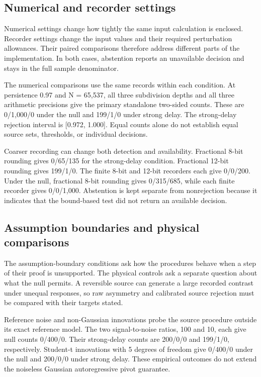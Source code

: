 \subsection{Numerical and recorder settings}

Numerical settings change how tightly the same input calculation is enclosed. Recorder settings change the input values and their required perturbation allowances. Their paired comparisons therefore address different parts of the implementation. In both cases, abstention reports an unavailable decision and stays in the full sample denominator.

The numerical comparisons use the same records within each condition. At persistence 0.97 and N = 65,537, all three subdivision depths and all three arithmetic precisions give the primary standalone two-sided counts. These are 0/1,000/0 under the null and 199/1/0 under strong delay. The strong-delay rejection interval is [0.972, 1.000]. Equal counts alone do not establish equal source sets, thresholds, or individual decisions.

Coarser recording can change both detection and availability. Fractional 8-bit rounding gives 0/65/135 for the strong-delay condition. Fractional 12-bit rounding gives 199/1/0. The finite 8-bit and 12-bit recorders each give 0/0/200. Under the null, fractional 8-bit rounding gives 0/315/685, while each finite recorder gives 0/0/1,000. Abstention is kept separate from nonrejection because it indicates that the bound-based test did not return an available decision.

\subsection{Assumption boundaries and physical comparisons}

The assumption-boundary conditions ask how the procedures behave when a step of their proof is unsupported. The physical controls ask a separate question about what the null permits. A reversible source can generate a large recorded contrast under unequal responses, so raw asymmetry and calibrated source rejection must be compared with their targets stated.

Reference noise and non-Gaussian innovations probe the source procedure outside its exact reference model. The two signal-to-noise ratios, 100 and 10, each give null counts 0/400/0. Their strong-delay counts are 200/0/0 and 199/1/0, respectively. Student-t innovations with 5 degrees of freedom give 0/400/0 under the null and 200/0/0 under strong delay. These empirical outcomes do not extend the noiseless Gaussian autoregressive pivot guarantee.

